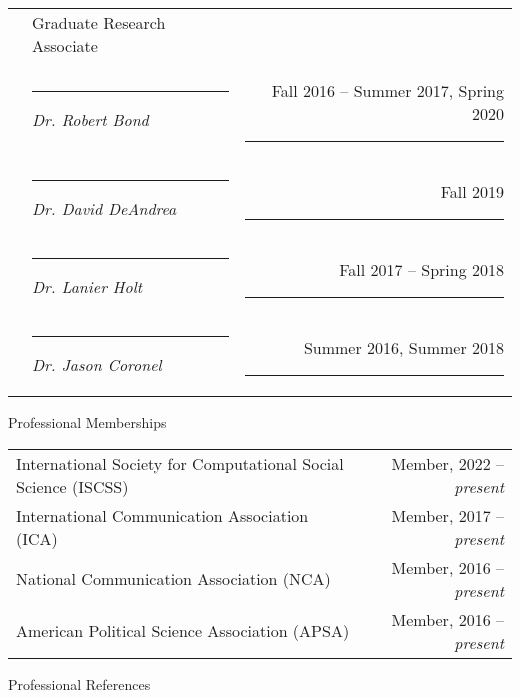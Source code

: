 \documentclass[letterpaper, 10pt]{extarticle}
\begin{document}
\vspace{0.5em}
\begin{tabularx}{\textwidth}{lXr}
&Graduate Research Associate\vspace{0.25em}\\
&\rule{1em}{0pt}\textit{Dr. Robert Bond} & Fall 2016 -- Summer 2017, Spring 2020\rule{2em}{0pt}\vspace{.125em}\\
&\rule{1em}{0pt}\textit{Dr. David DeAndrea} & Fall 2019\rule{2em}{0pt}\vspace{.125em}\\
&\rule{1em}{0pt}\textit{Dr. Lanier Holt} & Fall 2017 -- Spring 2018\rule{2em}{0pt}\vspace{.125em}\\
&\rule{1em}{0pt}\textit{Dr. Jason Coronel} & Summer 2016, Summer 2018\rule{2em}{0pt}\\
\end{tabularx}

\vspace{1em}
{\large Professional Memberships}

\vspace{1em}
\begin{tabularx}{\textwidth}{Xr}
International Society for Computational Social Science (ISCSS) & Member, 2022 -- \textit{present}\vspace{0.5em}\\
International Communication Association (ICA) & Member, 2017 -- \textit{present}\vspace{0.5em}\\
National Communication Association (NCA) & Member, 2016 -- \textit{present}\vspace{0.5em}\\
American Political Science Association (APSA) & Member, 2016 -- \textit{present}\vspace{0.5em}\\
\end{tabularx}

\pagebreak
{\large Professional References}
\end{document}
